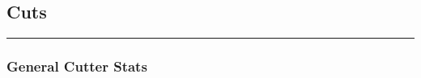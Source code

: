 \documentclass[a4paper,12pt]{article}
\begin{document}
\clearpage



\subsection{Cuts}

\vspace{1em} %
\hrule height 1pt width 1\textwidth %
\vspace{0em} %

\subsubsection{General Cutter Stats}
\end{document}
